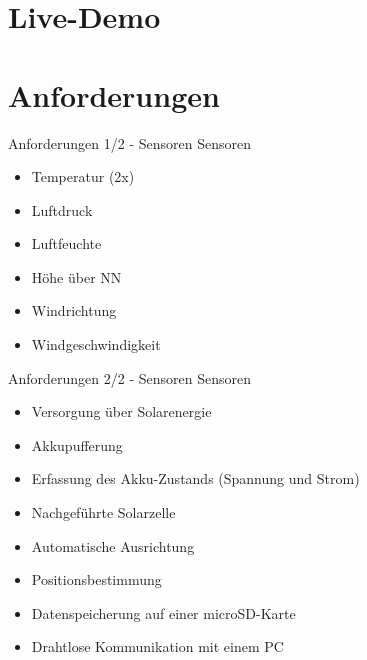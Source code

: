 \documentclass{beamer}
\begin{document}
\section{Live-Demo}

\section{Anforderungen}
\begin{frame}{Anforderungen 1/2 - Sensoren}
	Sensoren
    \begin{itemize}
        \item Temperatur (2x)
        \item Luftdruck
		\item Luftfeuchte
		\item Höhe über NN
		\item Windrichtung
		\item Windgeschwindigkeit
    \end{itemize}
\end{frame}

\begin{frame}{Anforderungen 2/2 - Sensoren}
	Sensoren
    \begin{itemize}
        \item Versorgung über Solarenergie
		\item Akkupufferung
		\item Erfassung des Akku-Zustands (Spannung und Strom)
		\item Nachgeführte Solarzelle
		\item Automatische Ausrichtung
		\item Positionsbestimmung
		\item Datenspeicherung auf einer microSD-Karte
		\item Drahtlose Kommunikation mit einem PC
    \end{itemize}
\end{frame}
\end{document}
